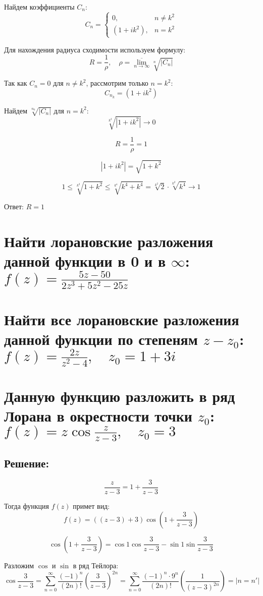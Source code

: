 \documentclass{article}
\begin{document}
Найдем коэффициенты $C_n$:
\[
C_n = 
\begin{cases} 
0, & n \neq k^2 \\
(1 + ik^2), & n = k^2 
\end{cases}
\]

Для нахождения радиуса сходимости используем формулу:
\[
R = \frac{1}{\rho}, \quad \rho = \overline{\lim_{n \to \infty}} \sqrt[n]{|C_n|}
\]

Так как $C_n = 0$ для $n \neq k^2$, рассмотрим только $n = k^2$:
\[
C_{n_k} = (1 + ik^2)
\]

Найдем $\sqrt[n_k]{|C_n|}$ для $n = k^2$:
\[
\sqrt[k^2]{|1 + ik^2|} \rightarrow 0
\]

\[
R = \frac{1}{\rho} = 1
\]

\[
|1 + ik^2| = \sqrt{1 + k^2}
\]

\[
1 \leqslant \sqrt[k^2]{1 + k^2} \leqslant \sqrt[k^4]{k^4 + k^4} = \sqrt[k^2]{2} \cdot \sqrt[k^2]{k^4} \rightarrow 1
\]

Ответ: $R = 1 $

\section{Найти лорановские разложения данной функции в 0 и в $\infty$: $f(z) = \frac{5z - 50}{2z^3 + 5z^2 - 25z}$}

\section{Найти все лорановские разложения данной функции по степеням $z - z_0$: $f(z) = \frac{2z}{z^2 - 4}, \quad z_0 = 1 + 3i$}

\section{Данную функцию разложить в ряд Лорана в окрестности точки $z_0$: $f(z) = z \cos \frac{z}{z - 3}, \quad z_0 = 3$}
\subsection{Решение:}

\[
\frac{z}{z-3} = 1 + \frac{3}{z-3}
\]

Тогда функция $f(z)$ примет вид:
\[
f(z) = \left((z - 3) + 3\right) \cos \left(1 + \frac{3}{z-3}\right)
\]

\[
\cos \left(1 + \frac{3}{z-3}\right) = \cos 1 \cos \frac{3}{z-3} - \sin 1 \sin \frac{3}{z-3}
\]

Разложим $\cos$ и $\sin$ в ряд Тейлора:
\[
\cos \frac{3}{z-3} = \sum_{n=0}^{\infty} \frac{(-1)^n}{(2n)!} \left(\frac{3}{z-3}\right)^{2n} =  \sum_{n=0}^{\infty} \frac{(-1)^n \cdot 9^n}{(2n)!} \left(\frac{1}{(z-3)^{2n}}\right) = \left|n = n'\right|
\]
\end{document}
